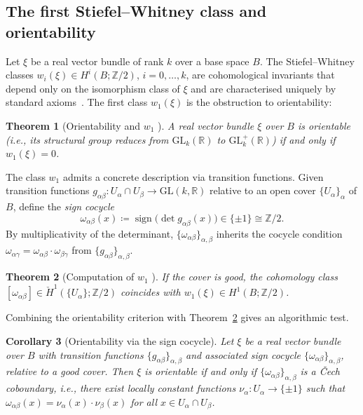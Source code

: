 \documentclass[11pt]{article}
\newcommand{\R}{\mathbb{R}}
\newcommand{\Z}{\mathbb{Z}}
\newcommand{\GL}{\mathrm{GL}}
\theoremstyle{plain}
\newtheorem{theorem}{Theorem}[section]
\newtheorem{corollary}[theorem]{Corollary}
\theoremstyle{definition}
\theoremstyle{remark}
\begin{document}
\subsection{The first Stiefel--Whitney class and orientability}\label{sec:characteristic-classes}
 
Let $\xi$ be a real vector bundle of rank $k$ over a base space $B$. The Stiefel--Whitney classes $w_i(\xi)\in H^i(B;\Z/2)$, $i=0,\dots,k$, are cohomological invariants that depend only on the isomorphism class of $\xi$ and are characterised uniquely by standard axioms~\cite{milnor1974characteristic}. The first class $w_1(\xi)$ is the obstruction to orientability:

\begin{theorem}[Orientability and $w_1$ {\cite[Proposition~4.2]{milnor1974characteristic}}]\label{thm:orientability-w1}
A real vector bundle $\xi$ over $B$ is \emph{orientable} (i.e., its structural group reduces from $\GL_k(\R)$ to $\GL_k^+(\R)$) if and only if $w_1(\xi) = 0$.
\end{theorem}
 
The class $w_1$ admits a concrete description via transition functions. Given transition functions $g_{\alpha\beta}\colon U_\alpha\cap U_\beta\to\GL(k,\R)$ relative to an open cover $\{U_\alpha\}_\alpha$ of $B$, define the \emph{sign cocycle}
\[
\omega_{\alpha\beta}(x)\coloneqq\operatorname{sign}\!\bigl(\det g_{\alpha\beta}(x)\bigr)\in\{\pm 1\}\cong\Z/2.
\]
By multiplicativity of the determinant, $\{\omega_{\alpha\beta}\}_{\alpha,\beta}$ inherits the cocycle condition $\omega_{\alpha\gamma}=\omega_{\alpha\beta}\cdot\omega_{\beta\gamma}$ from $\{g_{\alpha\beta}\}_{\alpha,\beta}$.
 
\begin{theorem}[Computation of $w_1$ {\cite[p.~148]{milnor1974characteristic}}]
\label{thm:w1-sign}
If the cover is good, the cohomology class $[\omega_{\alpha\beta}]\in\check{H}^1(\{U_\alpha\};\Z/2)$ coincides with $w_1(\xi)\in H^1(B;\Z/2)$.
\end{theorem}
 
Combining the orientability criterion with Theorem~\ref{thm:w1-sign} gives an algorithmic test.
 
\begin{corollary}[Orientability via the sign cocycle]
\label{cor:orientability-sign}
Let $\xi$ be a real vector bundle over $B$ with transition functions $\{g_{\alpha\beta}\}_{\alpha,\beta}$ and associated sign cocycle $\{\omega_{\alpha\beta}\}_{\alpha,\beta}$, relative to a good cover. Then $\xi$ is orientable if and only if $\{\omega_{\alpha\beta}\}_{\alpha,\beta}$ is a \v{C}ech coboundary, i.e., there exist locally constant functions $\nu_\alpha\colon U_\alpha\to\{\pm 1\}$ such that
$\omega_{\alpha\beta}(x)=\nu_\alpha(x)\cdot\nu_\beta(x)$ for all $x\in U_\alpha\cap U_\beta$.
\end{corollary}
 
\end{document}
